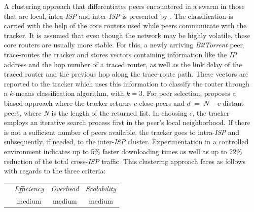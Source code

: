 A clustering approach that differentiates peers encountered in a swarm
in those that are local, intra-\emph{ISP} and inter-\emph{ISP} is 
presented by \textbf{\cite{QLZG2009}}.
The classification is carried with the help of the core routers used 
while peers communicate with the tracker. It is assumed that even though the
network may be highly volatile, these core routers are usually more stable.
For this, a newly arriving
\emph{BitTorrent} peer, trace-routes the tracker and stores vectors containing
information like the \emph{IP} address and the hop number of a traced router, as well as the
link delay of the traced router and the previous hop along the trace-route path.
These vectors are reported to the tracker which uses
this information
to classify the router through a $k$-means classification algorithm, with $k = 3$. 
For peer selection, \cite{QLZG2009} proposes a biased approach 
where the tracker returns $c$ close peers 
and $d\;=\;N-c$ distant peers, where $N$ is the length of the returned list. 
In choosing $c$, the tracker employs an iterative search process
first in the peer's local neighborhood. If there is not a sufficient number of 
peers available, the tracker goes to intra-\emph{ISP} 
and subsequently, if needed, to the inter-\emph{ISP} cluster. 
Experimentation in a controlled environment indicates up to
5\% faster downloading times as well as up to 22\% reduction of 
the total cross-\emph{ISP} traffic.
This clustering approach fares as follows with regards 
to the three criteria:
\begin{center}
{\footnotesize
\begin{tabular}{rccc}
\multicolumn{1}{r}{} &
\multicolumn{1}{c}{\emph{Efficiency}} &
\multicolumn{1}{c}{\emph{Overhead}} &
\multicolumn{1}{c}{\emph{Scalability}}
\\
\cline{2-4}
\emph{\cite{QLZG2009}} &
medium &
medium &
medium
\end{tabular}
}
\end{center}

